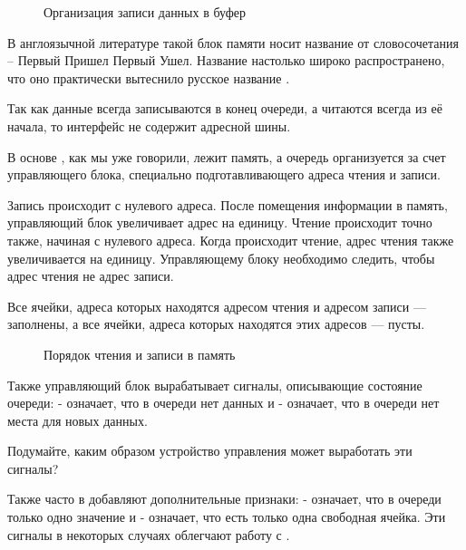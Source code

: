 \begin{figure}[H]
	\centering
	\def\svgwidth{12cm}
	
	\caption{Организация записи данных в буфер}
\end{figure}

\par{В англоязычной литературе такой блок памяти носит название  от словосочетания  – Первый Пришел Первый Ушел. Название  настолько широко распространено, что оно практически вытеснило русское название .}

\par{Так как данные всегда записываются в конец очереди, а читаются всегда из её начала, то интерфейс  не содержит адресной шины.}

\vspace{4mm}

\par{В основе , как мы уже говорили, лежит  память, а очередь организуется за счет управляющего блока, специально подготавливающего адреса чтения и записи.}

\par{Запись происходит с нулевого адреса. После помещения информации в память, управляющий блок увеличивает адрес на единицу. Чтение происходит точно также, начиная с нулевого адреса. Когда происходит чтение, адрес чтения также увеличивается на единицу. Управляющему блоку необходимо следить, чтобы адрес чтения не  адрес записи.}

\par{Все ячейки, адреса которых находятся  адресом чтения и адресом записи — заполнены, а все ячейки, адреса которых находятся  этих адресов — пусты.}

\begin{figure}[H]
	\centering
	\def\svgwidth{\columnwidth}
	
	\caption{Порядок чтения и записи в память}
\end{figure}

\par{Также управляющий блок вырабатывает сигналы, описывающие состояние очереди:  - означает, что в очереди нет данных и  - означает, что в очереди нет места для новых данных.}

\par{Подумайте, каким образом устройство управления может выработать эти сигналы?}

\par{Также часто в  добавляют дополнительные признаки:  - означает, что в очереди только одно значение и  - означает, что есть только одна свободная ячейка. Эти сигналы в некоторых случаях облегчают работу с .}


